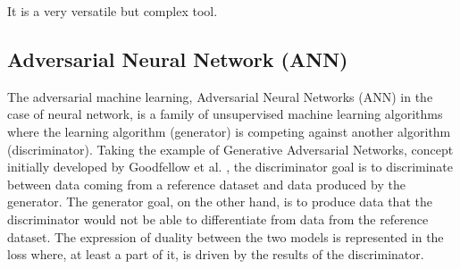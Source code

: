 It is a very versatile but complex tool.

\subsection{Adversarial Neural Network (ANN)}

The adversarial machine learning, Adversarial Neural Networks (ANN) in the case of neural network, is a family of unsupervised machine learning algorithms where the learning algorithm (generator) is competing against another algorithm (discriminator). Taking the example of Generative Adversarial Networks, concept initially developed by Goodfellow et al. \cite{goodfellow_generative_2014}, the discriminator goal is to discriminate between data coming from a reference dataset and data produced by the generator.
The generator goal, on the other hand, is to produce data that the discriminator would not be able to differentiate from data from the reference dataset. The expression of duality between the two models is represented in the loss where, at least a part of it, is driven by the results of the discriminator.

